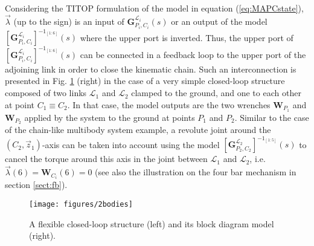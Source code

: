 Considering the TITOP formulation of the model in equation (\ref{eq:MAPCstate}), $\vec{\lambda}$ (up to the sign) is an input of $\mathbf{G}_{P_i,C_i}^{\mathcal{L}_i}(s)$ or an output of the model $\left[\mathbf{G}_{P_i,C_i}^{\mathcal{L}_i}\right]^{-1_{[1:6]}}(s)$ where the upper port is inverted. Thus, the upper port of $\left[\mathbf{G}_{P_i,C_i}^{\mathcal{L}_i}\right]^{-1_{[1:6]}}(s)$ can be connected in a feedback loop to the upper port of the adjoining link in order to close the kinematic chain. Such an interconnection is presented in Fig. \ref{fig:2bodies} (right) in the case of a very simple closed-loop structure composed of two links $\mathcal{L}_1$ and $\mathcal{L}_2$ clamped to the ground, and one to each other at point $C_1 \equiv C_2$. In that case, the model outputs are the two wrenches $\mathbf{W}_{P_1}$ and $\mathbf{W}_{P_2}$ applied by the system to the ground at points $P_1$ and $P_2$. Similar to the case of the chain-like multibody system example, a revolute joint around the $(C_2,\vec{z}_1)$-axis can be taken into account using the model $\left[\mathbf{G}_{P_2,C_2}^{\mathcal{L}_2}\right]^{-1_{[1:5]}}(s)$ to cancel the torque around this axis in the joint between $\mathcal{L}_1$ and $\mathcal{L}_2$, i.e. $\vec{\lambda}(6)=\mathbf{W}_{C_i}(6)=0$ (see also the illustration on the four bar mechanism in section \ref{sect:fb}). 
\begin{figure}[htbp!]
  \texttt{[image: figures/2bodies]}
\caption{A flexible closed-loop structure (left) and its block diagram model (right).}
\label{fig:2bodies} 
\end{figure}

